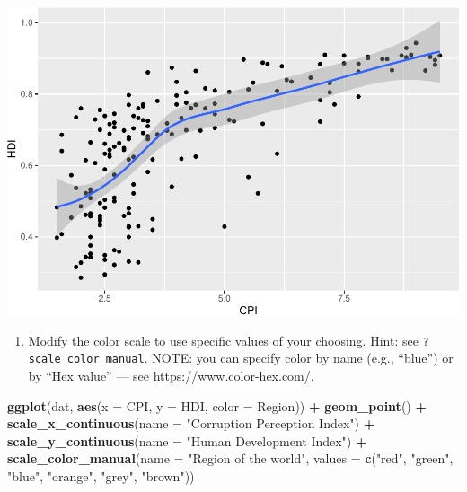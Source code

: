 \documentclass[
]{book}
\newenvironment{Shaded}{\begin{snugshade}}{\end{snugshade}}
\newcommand{\DataTypeTok}[1]{\textcolor[rgb]{0.13,0.29,0.53}{#1}}
\newcommand{\KeywordTok}[1]{\textcolor[rgb]{0.13,0.29,0.53}{\textbf{#1}}}
\newcommand{\NormalTok}[1]{#1}
\newcommand{\OperatorTok}[1]{\textcolor[rgb]{0.81,0.36,0.00}{\textbf{#1}}}
\newcommand{\StringTok}[1]{\textcolor[rgb]{0.31,0.60,0.02}{#1}}
\providecommand{\tightlist}{%
  \setlength{\itemsep}{0pt}\setlength{\parskip}{0pt}}
\begin{document}
\begin{alert}
\includegraphics{R/Rgraphics/figures/unnamed-chunk-203-1.pdf}

\begin{enumerate}
\def\labelenumi{\arabic{enumi}.}
\setcounter{enumi}{2}
\tightlist
\item
  Modify the color scale to use specific values of your choosing. Hint: see \texttt{?scale\_color\_manual}. NOTE: you can specify color by name (e.g., ``blue'') or by ``Hex value'' --- see \url{https://www.color-hex.com/}.
\end{enumerate}

\begin{Shaded}
\begin{Highlighting}[]
\KeywordTok{ggplot}\NormalTok{(dat, }\KeywordTok{aes}\NormalTok{(}\DataTypeTok{x =}\NormalTok{ CPI, }\DataTypeTok{y =}\NormalTok{ HDI, }\DataTypeTok{color =}\NormalTok{ Region)) }\OperatorTok{+}
\StringTok{  }\KeywordTok{geom\_point}\NormalTok{() }\OperatorTok{+}
\StringTok{  }\KeywordTok{scale\_x\_continuous}\NormalTok{(}\DataTypeTok{name =} \StringTok{"Corruption Perception Index"}\NormalTok{) }\OperatorTok{+}
\StringTok{  }\KeywordTok{scale\_y\_continuous}\NormalTok{(}\DataTypeTok{name =} \StringTok{"Human Development Index"}\NormalTok{) }\OperatorTok{+}
\StringTok{  }\KeywordTok{scale\_color\_manual}\NormalTok{(}\DataTypeTok{name =} \StringTok{"Region of the world"}\NormalTok{,}
                     \DataTypeTok{values =} \KeywordTok{c}\NormalTok{(}\StringTok{"red"}\NormalTok{, }\StringTok{"green"}\NormalTok{, }\StringTok{"blue"}\NormalTok{, }\StringTok{"orange"}\NormalTok{, }\StringTok{"grey"}\NormalTok{, }\StringTok{"brown"}\NormalTok{))}
\end{Highlighting}
\end{Shaded}


\end{alert}
\end{document}
